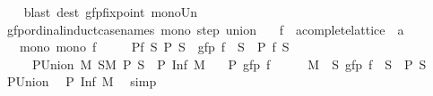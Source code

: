 \begin{isabellebody}
%
\isadelimproof
\ \ %
\endisadelimproof
%
\isatagproof
{}\isamarkupfalse%
\ {\isacharparenleft}{\kern0pt}blast\ dest{\isacharcolon}{\kern0pt}\ gfp{\isacharunderscore}{\kern0pt}fixpoint\ mono{\isacharunderscore}{\kern0pt}Un{\isacharparenright}{\kern0pt}%
\endisatagproof
{\isafoldproof}%
%
\isadelimproof
\isanewline
%
\endisadelimproof
\isanewline
{}\isamarkupfalse%
\ gfp{\isacharunderscore}{\kern0pt}ordinal{\isacharunderscore}{\kern0pt}induct{\isacharbrackleft}{\kern0pt}case{\isacharunderscore}{\kern0pt}names\ mono\ step\ union{\isacharbrackright}{\kern0pt}{\isacharcolon}{\kern0pt}\isanewline
\ \ \ f\ {\isacharcolon}{\kern0pt}{\isacharcolon}{\kern0pt}\ {\isachardoublequoteopen}{\isacharprime}{\kern0pt}a{\isacharcolon}{\kern0pt}{\isacharcolon}{\kern0pt}complete{\isacharunderscore}{\kern0pt}lattice\ {\isasymRightarrow}\ {\isacharprime}{\kern0pt}a{\isachardoublequoteclose}\isanewline
\ \ \ mono{\isacharcolon}{\kern0pt}\ {\isachardoublequoteopen}mono\ f{\isachardoublequoteclose}\isanewline
\ \ \ \ \ P{\isacharunderscore}{\kern0pt}f{\isacharcolon}{\kern0pt}\ {\isachardoublequoteopen}{\isasymAnd}S{\isachardot}{\kern0pt}\ P\ S\ {\isasymLongrightarrow}\ gfp\ f\ {\isasymle}\ S\ {\isasymLongrightarrow}\ P\ {\isacharparenleft}{\kern0pt}f\ S{\isacharparenright}{\kern0pt}{\isachardoublequoteclose}\isanewline
\ \ \ \ \ P{\isacharunderscore}{\kern0pt}Union{\isacharcolon}{\kern0pt}\ {\isachardoublequoteopen}{\isasymAnd}M{\isachardot}{\kern0pt}\ {\isasymforall}S{\isasymin}M{\isachardot}{\kern0pt}\ P\ S\ {\isasymLongrightarrow}\ P\ {\isacharparenleft}{\kern0pt}Inf\ M{\isacharparenright}{\kern0pt}{\isachardoublequoteclose}\isanewline
\ \ \ {\isachardoublequoteopen}P\ {\isacharparenleft}{\kern0pt}gfp\ f{\isacharparenright}{\kern0pt}{\isachardoublequoteclose}\isanewline
%
\isadelimproof
%
\endisadelimproof
%
\isatagproof
{}\isamarkupfalse%
\ {\isacharminus}{\kern0pt}\isanewline
\ \ \isamarkupfalse%
\ {\isacharquery}{\kern0pt}M\ {\isacharequal}{\kern0pt}\ {\isachardoublequoteopen}{\isacharbraceleft}{\kern0pt}S{\isachardot}{\kern0pt}\ gfp\ f\ {\isasymle}\ S\ {\isasymand}\ P\ S{\isacharbraceright}{\kern0pt}{\isachardoublequoteclose}\isanewline
\ \ \isamarkupfalse%
\ P{\isacharunderscore}{\kern0pt}Union\ \isamarkupfalse%
\ {\isachardoublequoteopen}P\ {\isacharparenleft}{\kern0pt}Inf\ {\isacharquery}{\kern0pt}M{\isacharparenright}{\kern0pt}{\isachardoublequoteclose}\ \isamarkupfalse%
\ simp\isanewline

\end{isabellebody}
